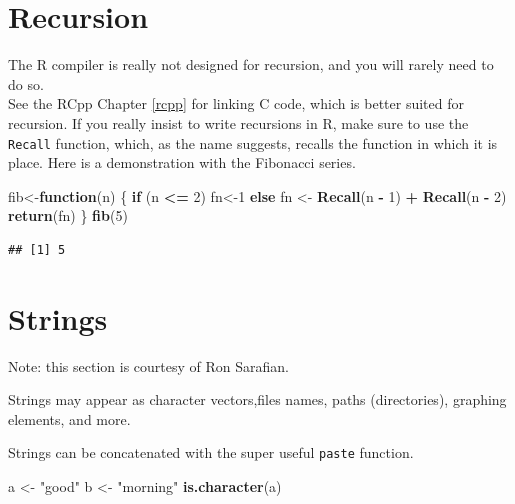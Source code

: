 \documentclass[]{book}
\newenvironment{Shaded}{\begin{snugshade}}{\end{snugshade}}
\newcommand{\KeywordTok}[1]{\textcolor[rgb]{0.13,0.29,0.53}{\textbf{#1}}}
\newcommand{\DecValTok}[1]{\textcolor[rgb]{0.00,0.00,0.81}{#1}}
\newcommand{\StringTok}[1]{\textcolor[rgb]{0.31,0.60,0.02}{#1}}
\newcommand{\ControlFlowTok}[1]{\textcolor[rgb]{0.13,0.29,0.53}{\textbf{#1}}}
\newcommand{\OperatorTok}[1]{\textcolor[rgb]{0.81,0.36,0.00}{\textbf{#1}}}
\newcommand{\NormalTok}[1]{#1}
\theoremstyle{definition}
\theoremstyle{definition}
\theoremstyle{definition}
\theoremstyle{remark}
\begin{document}
\section{Recursion}\label{recursion}

The R compiler is really not designed for recursion, and you will rarely
need to do so.\\
See the RCpp Chapter \ref{rcpp} for linking C code, which is better
suited for recursion. If you really insist to write recursions in R,
make sure to use the \texttt{Recall} function, which, as the name
suggests, recalls the function in which it is place. Here is a
demonstration with the Fibonacci series.

\begin{Shaded}
\begin{Highlighting}[]
\NormalTok{fib<-}\ControlFlowTok{function}\NormalTok{(n) \{}
    \ControlFlowTok{if}\NormalTok{ (n }\OperatorTok{<=}\StringTok{ }\DecValTok{2}\NormalTok{) fn<-}\DecValTok{1} 
    \ControlFlowTok{else}\NormalTok{ fn <-}\StringTok{ }\KeywordTok{Recall}\NormalTok{(n }\OperatorTok{-}\StringTok{ }\DecValTok{1}\NormalTok{) }\OperatorTok{+}\StringTok{ }\KeywordTok{Recall}\NormalTok{(n }\OperatorTok{-}\StringTok{ }\DecValTok{2}\NormalTok{) }
    \KeywordTok{return}\NormalTok{(fn)}
\NormalTok{\} }
\KeywordTok{fib}\NormalTok{(}\DecValTok{5}\NormalTok{)}
\end{Highlighting}
\end{Shaded}

\begin{verbatim}
## [1] 5
\end{verbatim}

\section{Strings}\label{strings}

Note: this section is courtesy of Ron Sarafian.

Strings may appear as character vectors,files names, paths
(directories), graphing elements, and more.

Strings can be concatenated with the super useful \texttt{paste}
function.

\begin{Shaded}
\begin{Highlighting}[]
\NormalTok{a <-}\StringTok{ "good"}
\NormalTok{b <-}\StringTok{ "morning"}
\KeywordTok{is.character}\NormalTok{(a)}
\end{Highlighting}
\end{Shaded}
\end{document}
